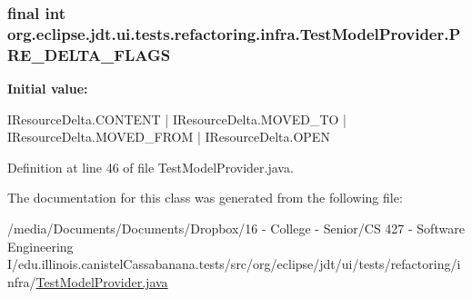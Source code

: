 \hypertarget{classorg_1_1eclipse_1_1jdt_1_1ui_1_1tests_1_1refactoring_1_1infra_1_1TestModelProvider_aa3f53621c627feb54da436301e629de8}{
\subsubsection[{PRE\_\-DELTA\_\-FLAGS}]{\setlength{\rightskip}{0pt plus 5cm}final int {\bf org.eclipse.jdt.ui.tests.refactoring.infra.TestModelProvider.PRE\_\-DELTA\_\-FLAGS}}}
\label{classorg_1_1eclipse_1_1jdt_1_1ui_1_1tests_1_1refactoring_1_1infra_1_1TestModelProvider_aa3f53621c627feb54da436301e629de8}
{\bfseries Initial value:}
\begin{DoxyCode}
 IResourceDelta.CONTENT | IResourceDelta.MOVED_TO | 
          IResourceDelta.MOVED_FROM | IResourceDelta.OPEN
\end{DoxyCode}


Definition at line 46 of file TestModelProvider.java.



The documentation for this class was generated from the following file:\begin{DoxyCompactItemize}
\item 
/media/Documents/Documents/Dropbox/16 -\/ College -\/ Senior/CS 427 -\/ Software Engineering I/edu.illinois.canistelCassabanana.tests/src/org/eclipse/jdt/ui/tests/refactoring/infra/\hyperlink{TestModelProvider_8java}{TestModelProvider.java}\end{DoxyCompactItemize}
